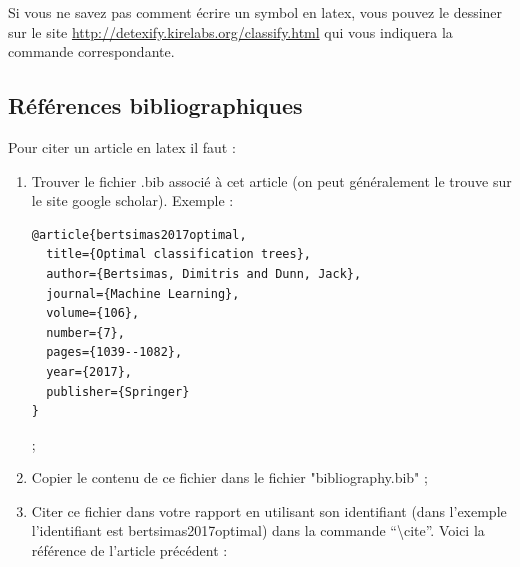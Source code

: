 \documentclass[12pt]{report}
\begin{document}
Si vous  ne savez pas comment  écrire un symbol en  latex, vous pouvez
le dessiner sur le site
\href{http://detexify.kirelabs.org/classify.html}{http://detexify.kirelabs.org/classify.html}
qui vous indiquera la commande correspondante.



\subsection{Références bibliographiques}
 
Pour citer un article en latex il faut :
\begin{enumerate}
\item  Trouver  le  fichier  .bib  associé  à  cet  article  (on  peut
  généralement le trouve sur le site google
  scholar). Exemple :
\begin{verbatim}
@article{bertsimas2017optimal,
  title={Optimal classification trees},
  author={Bertsimas, Dimitris and Dunn, Jack},
  journal={Machine Learning},
  volume={106},
  number={7},
  pages={1039--1082},
  year={2017},
  publisher={Springer}
}
\end{verbatim}

;
\item   Copier   le   contenu   de  ce   fichier   dans   le   fichier
  "bibliography.bib" ;
\item Citer ce fichier dans votre rapport en utilisant son identifiant (dans l'exemple
  l'identifiant   est    bertsimas2017optimal)   dans    la   commande
  ``\textbackslash cite''. Voici la référence de l'article précédent : \cite{bertsimas2017optimal}
\end{enumerate}





\end{document}
